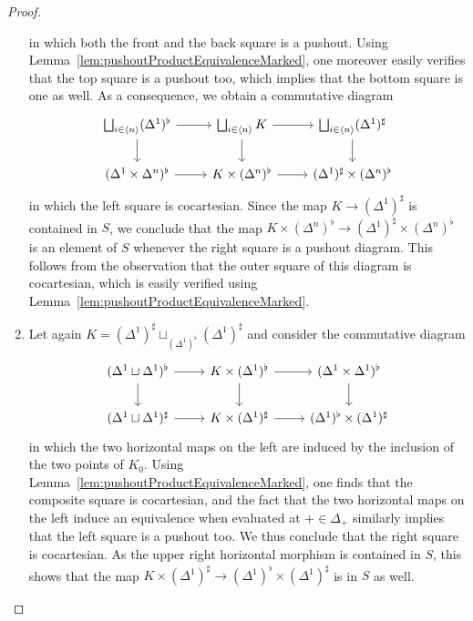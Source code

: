\documentclass[reqno]{amsart}
\numberwithin{equation}{subsection}
\theoremstyle{plain}
\theoremstyle{definition}
\newcommand{\ord}[1]{\langle#1\rangle}
\begin{document}
\begin{proof}
\begin{enumerate}
\begin{equation*}
	 	\end{equation*}
	 	in which both the front and the back square is a pushout. Using Lemma~\ref{lem:pushoutProductEquivalenceMarked}, one moreover easily verifies that the top square is a pushout too, which implies that the bottom square is one as well. As a consequence, we obtain a commutative diagram
	 	\begin{equation*}
	 		\begin{tikzcd}
	 		\bigsqcup_{i\in \ord{n}} (\Delta^1)^\flat\arrow[r]\arrow[d] & \bigsqcup_{i\in \ord{n}} K\arrow[r] \arrow[d]& \bigsqcup_{i\in \ord{n}} (\Delta^1)^\sharp\arrow[d]\\
	 		(\Delta^1\times\Delta^n)^\flat\arrow[r] & K\times(\Delta^n)^\flat\arrow[r] & (\Delta^1)^\sharp\times(\Delta^n)^\flat
	 		\end{tikzcd}
	 	\end{equation*}
	 	in which the left square is cocartesian. Since the map $K\to (\Delta^1)^\sharp$ is contained in $S$, we conclude that the map $K\times(\Delta^n)^\flat\to (\Delta^1)^\sharp\times(\Delta^n)^\flat$ is an element of $S$ whenever the right square is a pushout diagram. This follows from the observation that the outer square of this diagram is cocartesian, which is easily verified using Lemma~\ref{lem:pushoutProductEquivalenceMarked}.
	 	\item Let again $K= (\Delta^1)^\sharp\sqcup_{(\Delta^1)^\flat}(\Delta^1)^\sharp$ and consider the commutative diagram
	 	\begin{equation*}
	 		\begin{tikzcd}
	 		(\Delta^1\sqcup\Delta^1)^\flat\arrow[r]\arrow[d] & K\times(\Delta^1)^\flat\arrow[d] \arrow[r] & (\Delta^1\times\Delta^1)^\flat\arrow[d]\\
	 		(\Delta^1\sqcup\Delta^1)^\sharp\arrow[r] & K\times(\Delta^1)^\sharp\arrow[r] & (\Delta^1)^\flat\times(\Delta^1)^\sharp
	 		\end{tikzcd}
	 	\end{equation*}
	 	in which the two horizontal maps on the left are induced by the inclusion of the two points of $K_0$. Using Lemma~\ref{lem:pushoutProductEquivalenceMarked}, one finds that the composite square is cocartesian, and the fact that the two horizontal maps on the left induce an equivalence when evaluated at $+\in \Delta_+$ similarly implies that the left square is a pushout too. We thus conclude that the right square is cocartesian. As the upper right horizontal morphism is contained in $S$, this shows that the map $K\times(\Delta^1)^\sharp\to (\Delta^1)^\flat\times(\Delta^1)^\sharp$ is in $S$ as well.\qedhere
	 	\end{enumerate}
\end{proof}
\end{document}
